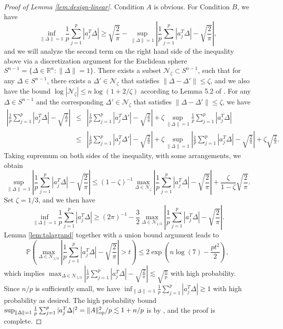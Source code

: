 \begin{proof}[Proof of Lemma \ref{lem:design-linear}]
Condition $A$ is obvious. For Condition $B$, we have
$$
\inf_{\|\Delta\|=1}\frac{1}{p}\sum_{j=1}^p|a_j^T\Delta| \geq \sqrt{\frac{2}{\pi}} - \sup_{\|\Delta\|=1}\left|\frac{1}{p}\sum_{j=1}^p|a_j^T\Delta| - \sqrt{\frac{2}{\pi}} \right|,
$$
and we will analyze the second term on the right hand side of the inequality above via a discretization argument for the Euclidean sphere $S^{n-1}=\{\Delta\in\mathbb{R}^n: \|\Delta\|=1\}$. There exists a subset $\mathcal{N}_{\zeta}\subset S^{n-1}$, such that for any $\Delta\in S^{n-1}$, there exists a $\Delta'\in\mathcal{N}_{\zeta}$ that satisfies $\|\Delta-\Delta'\|\leq\zeta$, and we also have the bound $\log|\mathcal{N}_{\zeta}|\leq n\log\left(1+2/\zeta\right)$ according to Lemma 5.2 of \cite{vershynin2010introduction}. For any $\Delta\in S^{n-1}$ and the corresponding $\Delta'\in\mathcal{N}_{\zeta}$ that satisfies $\|\Delta-\Delta'\|\leq \zeta$, we have
\begin{eqnarray*}
\left|\frac{1}{p}\sum_{j=1}^p|a_j^T\Delta| - \sqrt{\frac{2}{\pi}} \right| &\leq& \left|\frac{1}{p}\sum_{j=1}^p|a_j^T\Delta'| - \sqrt{\frac{2}{\pi}} \right|  + \zeta\sup_{\|\Delta\|=1}\frac{1}{p}\sum_{j=1}^p|a_j^T\Delta| \\
&\leq& \left|\frac{1}{p}\sum_{j=1}^p|a_j^T\Delta'| - \sqrt{\frac{2}{\pi}} \right| + \zeta\sup_{\|\Delta\|=1}\left|\frac{1}{p}\sum_{j=1}^p|a_j^T\Delta| - \sqrt{\frac{2}{\pi}} \right| + \zeta\sqrt{\frac{2}{\pi}}.
\end{eqnarray*}
Taking supremum on both sides of the inequality, with some arrangements, we obtain
$$\sup_{\|\Delta\|=1}\left|\frac{1}{p}\sum_{j=1}^p|a_j^T\Delta| - \sqrt{\frac{2}{\pi}} \right|\leq (1-\zeta)^{-1}\max_{\Delta\in\mathcal{N}_{\zeta}}\left|\frac{1}{p}\sum_{j=1}^p|a_j^T\Delta| - \sqrt{\frac{2}{\pi}} \right| + \frac{\zeta}{1-\zeta}\sqrt{\frac{2}{\pi}}.$$
Set $\zeta=1/3$, and we then have
$$\inf_{\|\Delta\|=1}\frac{1}{p}\sum_{j=1}^p|a_j^T\Delta| \geq (2\pi)^{-1} - \frac{3}{2}\max_{\Delta\in\mathcal{N}_{1/3}}\left|\frac{1}{p}\sum_{j=1}^p|a_j^T\Delta| - \sqrt{\frac{2}{\pi}} \right|.$$
Lemma \ref{lem:talagrand} together with a union bound argument leads to
$$\mathbb{P}\left(\max_{\Delta\in\mathcal{N}_{1/3}}\left|\frac{1}{p}\sum_{j=1}^p|a_j^T\Delta| - \sqrt{\frac{2}{\pi}} \right|>t\right)\leq 2\exp\left(n\log(7)-\frac{pt^2}{2}\right),$$
which implies $\max_{\Delta\in\mathcal{N}_{1/3}}\left|\frac{1}{p}\sum_{j=1}^p|a_j^T\Delta| - \sqrt{\frac{2}{\pi}} \right|\lesssim \sqrt{\frac{n}{p}}$ with high probability. Since $n/p$ is sufficiently small, we have $\inf_{\|\Delta\|=1}\frac{1}{p}\sum_{j=1}^p|a_j^T\Delta|\gtrsim 1$ with high probability as desired. The high probability bound $\sup_{\|\Delta\|=1}\frac{1}{p}\sum_{j=1}^p|a_j^T\Delta|^2=\|A\|_{\rm op}^2/p\lesssim 1+n/p$ is by \cite{davidson2001local}, and the proof is complete.
\end{proof}

